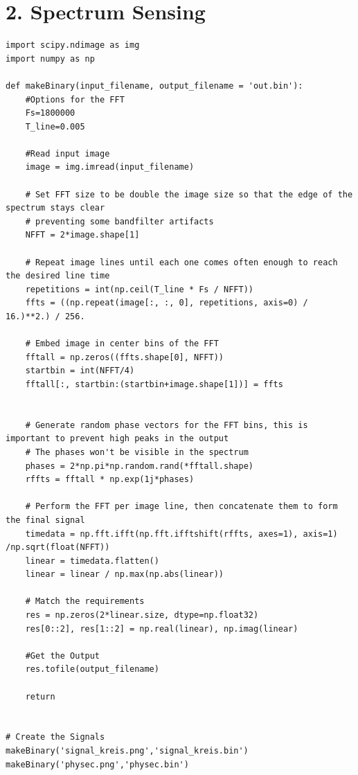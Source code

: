 \documentclass[12pt,a4paper]{article}
\begin{document}
\newpage
\section{2. Spectrum Sensing}
\begin{verbatim}
import scipy.ndimage as img
import numpy as np

def makeBinary(input_filename, output_filename = 'out.bin'):
    #Options for the FFT
    Fs=1800000 
    T_line=0.005
    
    #Read input image
    image = img.imread(input_filename)

    # Set FFT size to be double the image size so that the edge of the spectrum stays clear
    # preventing some bandfilter artifacts
    NFFT = 2*image.shape[1]

    # Repeat image lines until each one comes often enough to reach the desired line time
    repetitions = int(np.ceil(T_line * Fs / NFFT))
    ffts = ((np.repeat(image[:, :, 0], repetitions, axis=0) / 16.)**2.) / 256.

    # Embed image in center bins of the FFT
    fftall = np.zeros((ffts.shape[0], NFFT))
    startbin = int(NFFT/4)
    fftall[:, startbin:(startbin+image.shape[1])] = ffts


    # Generate random phase vectors for the FFT bins, this is important to prevent high peaks in the output
    # The phases won't be visible in the spectrum
    phases = 2*np.pi*np.random.rand(*fftall.shape)
    rffts = fftall * np.exp(1j*phases)

    # Perform the FFT per image line, then concatenate them to form the final signal
    timedata = np.fft.ifft(np.fft.ifftshift(rffts, axes=1), axis=1) /np.sqrt(float(NFFT))
    linear = timedata.flatten()
    linear = linear / np.max(np.abs(linear))

    # Match the requirements
    res = np.zeros(2*linear.size, dtype=np.float32)		
    res[0::2], res[1::2] = np.real(linear), np.imag(linear)				 
	
    #Get the Output
    res.tofile(output_filename)
    
    return


# Create the Signals
makeBinary('signal_kreis.png','signal_kreis.bin')
makeBinary('physec.png','physec.bin')

\end{verbatim}
\end{document}
